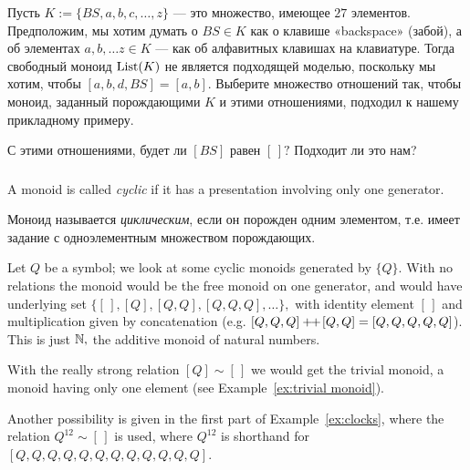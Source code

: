 \documentclass[../main/CT4S-EN-RU]{subfiles}
\begin{document}
\begin{exerciseRUS}
Пусть $K:=\{BS,a,b,c,\ldots,z\}$ — это множество, имеющее $27$ элементов. Предположим, мы хотим думать о $BS\in K$ как о клавише «backspace» (забой), а об элементах $a,b,\ldots z\in K$ — как об алфавитных клавишах на клавиатуре. Тогда свободный моноид $\operatorname{List}(K)$ не является подходящей моделью, поскольку мы хотим, чтобы $[a,b,d,BS]=[a,b].$
\sexc Выберите множество отношений так, чтобы моноид, заданный порождающими $K$ и этими отношениями, подходил к нашему прикладному примеру.
\item С этими отношениями, будет ли $[BS]$ равен $[\,]?$ Подходит ли это нам?
\endsexc
\end{exerciseRUS}


\subsubsection{}

\begin{definitionENG}
A monoid is called {\em cyclic} if it has a presentation involving only one generator.
\end{definitionENG}

\begin{definitionRUS}
Моноид называется {\em циклическим}, если он порожден одним элементом, т.е. имеет задание с одноэлементным множеством порождающих.
\end{definitionRUS}

\begin{exampleENG}\label{ex:cyclic}
Let $Q$ be a symbol; we look at some cyclic monoids generated by $\{Q\}.$ With no relations the monoid would be the free monoid on one generator, and would have underlying set $\{[\,],[Q],[Q,Q],[Q,Q,Q],\ldots\},$ with identity element $[\,]$ and multiplication given by concatenation (e.g. $[Q,Q,Q]+\!\!+\hspace{1pt}[Q,Q]=[Q,Q,Q,Q,Q]$). This is just ${\mathbb N},$ the additive monoid of natural numbers.

With the really strong relation $[Q]\sim[\,]$ we would get the trivial monoid, a monoid having only one element (see Example~\ref{ex:trivial monoid}).

Another possibility is given in the first part of Example~\ref{ex:clocks}, where the relation $Q^{12}\sim[\,]$ is used, where $Q^{12}$ is shorthand for $[Q,Q,Q,Q,Q,Q,Q,Q,Q,Q,Q,Q].$
\end{exampleENG}
\end{document}
